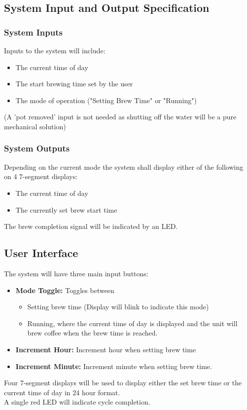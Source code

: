 \documentclass[12pt]{article}
\begin{document}
\subsection{System Input and Output Specification}

\subsubsection{System Inputs}
Inputs to the system will include:
\begin{itemize}
    \item The current time of day
    \item The start brewing time set by the user
    \item The mode of operation ("Setting Brew Time" or "Running")
\end{itemize}
{\small (A 'pot removed' input is not needed as shutting off the water will be a pure mechanical solution)}

\subsubsection{System Outputs}
Depending on the current mode the system shall display either of the following on 4 7-segment displays:
\begin{itemize}
    \item The current time of day
    \item The currently set brew start time 
\end{itemize}
The brew completion signal will be indicated by an LED.

\subsection{User Interface}
The system will have three main input buttons:
\begin{itemize}
    \item \textbf{Mode Toggle:} Toggles between
        \begin{itemize}
            \item Setting brew time (Display will blink to indicate this mode)
            \item Running, where the current time of day is displayed and the unit will brew coffee when the brew time is reached.
        \end{itemize}
    \item \textbf{Increment Hour:} Increment hour when setting brew time
    \item \textbf{Increment Minute:} Increment minute when setting brew time.
\end{itemize}
Four 7-segment displays will be used to display either the set brew time or the current time of day in 24 hour format.\\
A single red LED will indicate cycle completion.
\end{document}
